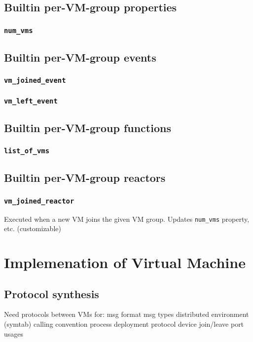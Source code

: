 \documentclass{note}
\begin{document}
\subsection{Builtin per-VM-group properties}
\subsubsection{\textcolor{red2}{\texttt{num\_vms}}}


\subsection{Builtin per-VM-group events}
\subsubsection{\textcolor{red2}{\texttt{vm\_joined\_event}}}
\subsubsection{\textcolor{red2}{\texttt{vm\_left\_event}}}

\subsection{Builtin per-VM-group functions}
\subsubsection{\textcolor{red2}{\texttt{list\_of\_vms}}}

\subsection{Builtin per-VM-group reactors}
\subsubsection{\textcolor{red2}{\texttt{vm\_joined\_reactor}}}
Executed when a new VM joins the given VM group.
Updates \textcolor{red2}{\texttt{num\_vms}} property, etc. (customizable)

\section{Implemenation of Virtual Machine}
\subsection{Protocol synthesis}
Need protocols between VMs for:
   \bit
   \w msg format
   \w msg types
   \w distributed environment (symtab)
   \w calling convention
   \w process deployment protocol 
   \w device join/leave 
   \w port usages
   \eit
\end{document}
